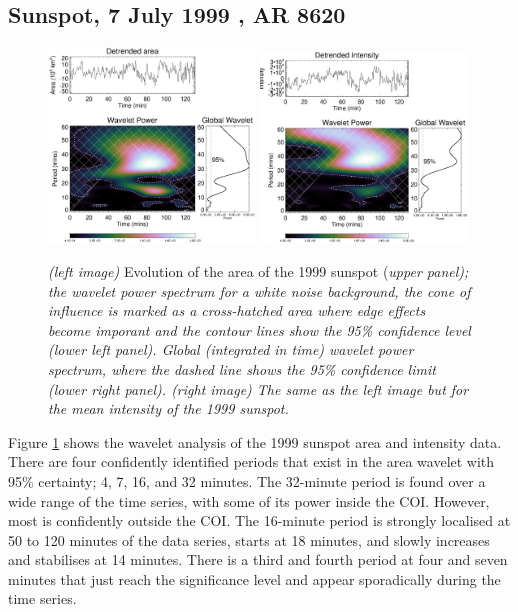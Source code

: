 \subsection{Sunspot, 7 July 1999 , AR 8620}

   \begin{figure}
	   \centering
       \includegraphics[width=0.49\textwidth]{1999_wl.eps}
       \includegraphics[width=0.49\textwidth]{1999_wl_inten.eps}
	   \caption{
				\textit{(left image)} Evolution of the area of the 1999 sunspot (\it{upper panel}); \textnormal{the wavelet power spectrum for a white noise background, the cone of influence is marked as a cross-hatched area where edge effects become imporant and the contour lines show the 95\% confidence level} (\it{lower left panel}). \textnormal{Global (integrated in time) wavelet power spectrum, where the dashed line shows the 95\% confidence limit} (\it{lower right panel}).  \textit{(right image)} \textnormal{The same as the left image but for the mean intensity of the 1999 sunspot.} 
				}
	   \label{1999sunspot}
   \end{figure}
   	
	Figure \ref{1999sunspot} shows the wavelet analysis of the 1999 sunspot area and intensity data. There are four confidently identified periods that exist in the area wavelet with 95\% certainty; 4, 7, 16, and 32 minutes.
	The 32-minute period is found over a wide range of the time series, with some of its power inside the COI.
	However, most is confidently outside the COI.
	The 16-minute period is strongly localised at 50 to 120 minutes of the data series, starts at 18 minutes, and slowly increases and stabilises at 14 minutes.
	There is a third and fourth period at four and  seven minutes that just reach the significance level and appear sporadically during the time series.
	
